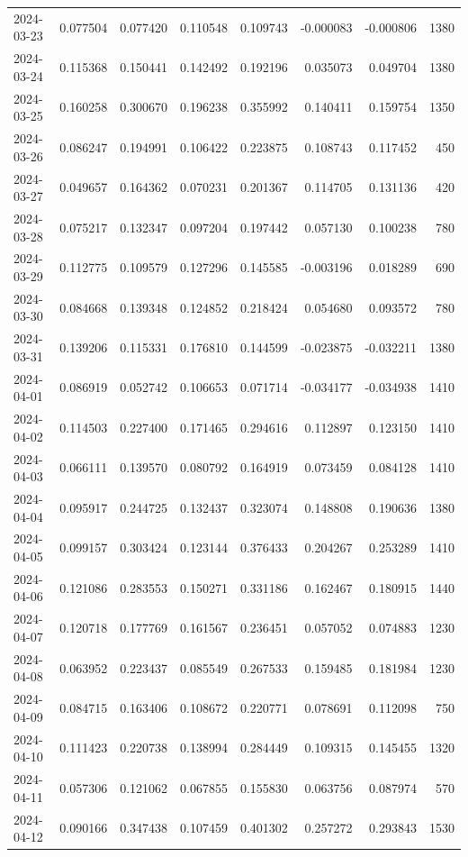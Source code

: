 \begin{tabular}{lrrrrrrr}
2024-03-23 & 0.077504 & 0.077420 & 0.110548 & 0.109743 & -0.000083 & -0.000806 & 1380 \\
2024-03-24 & 0.115368 & 0.150441 & 0.142492 & 0.192196 & 0.035073 & 0.049704 & 1380 \\
2024-03-25 & 0.160258 & 0.300670 & 0.196238 & 0.355992 & 0.140411 & 0.159754 & 1350 \\
2024-03-26 & 0.086247 & 0.194991 & 0.106422 & 0.223875 & 0.108743 & 0.117452 & 450 \\
2024-03-27 & 0.049657 & 0.164362 & 0.070231 & 0.201367 & 0.114705 & 0.131136 & 420 \\
2024-03-28 & 0.075217 & 0.132347 & 0.097204 & 0.197442 & 0.057130 & 0.100238 & 780 \\
2024-03-29 & 0.112775 & 0.109579 & 0.127296 & 0.145585 & -0.003196 & 0.018289 & 690 \\
2024-03-30 & 0.084668 & 0.139348 & 0.124852 & 0.218424 & 0.054680 & 0.093572 & 780 \\
2024-03-31 & 0.139206 & 0.115331 & 0.176810 & 0.144599 & -0.023875 & -0.032211 & 1380 \\
2024-04-01 & 0.086919 & 0.052742 & 0.106653 & 0.071714 & -0.034177 & -0.034938 & 1410 \\
2024-04-02 & 0.114503 & 0.227400 & 0.171465 & 0.294616 & 0.112897 & 0.123150 & 1410 \\
2024-04-03 & 0.066111 & 0.139570 & 0.080792 & 0.164919 & 0.073459 & 0.084128 & 1410 \\
2024-04-04 & 0.095917 & 0.244725 & 0.132437 & 0.323074 & 0.148808 & 0.190636 & 1380 \\
2024-04-05 & 0.099157 & 0.303424 & 0.123144 & 0.376433 & 0.204267 & 0.253289 & 1410 \\
2024-04-06 & 0.121086 & 0.283553 & 0.150271 & 0.331186 & 0.162467 & 0.180915 & 1440 \\
2024-04-07 & 0.120718 & 0.177769 & 0.161567 & 0.236451 & 0.057052 & 0.074883 & 1230 \\
2024-04-08 & 0.063952 & 0.223437 & 0.085549 & 0.267533 & 0.159485 & 0.181984 & 1230 \\
2024-04-09 & 0.084715 & 0.163406 & 0.108672 & 0.220771 & 0.078691 & 0.112098 & 750 \\
2024-04-10 & 0.111423 & 0.220738 & 0.138994 & 0.284449 & 0.109315 & 0.145455 & 1320 \\
2024-04-11 & 0.057306 & 0.121062 & 0.067855 & 0.155830 & 0.063756 & 0.087974 & 570 \\
2024-04-12 & 0.090166 & 0.347438 & 0.107459 & 0.401302 & 0.257272 & 0.293843 & 1530 \\

\end{tabular}

